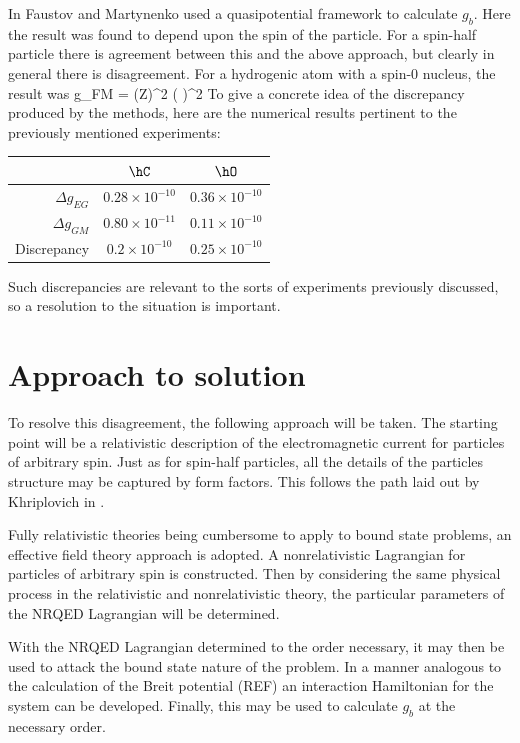 In \cite{doi:10.1139/p02-112} Faustov and Martynenko used a quasipotential framework to calculate $g_b$.  Here the result was found to depend upon the spin of the particle.  For a spin-half particle there is agreement between this and the above approach, but clearly in general there is disagreement.   For a hydrogenic atom with a spin-0 nucleus, the result was
\beq
	\Delta g_{FM} =  (Z\alpha)^2 \left(  \right )^2
\eeq
To give a concrete idea of the discrepancy produced by the methods, here are the numerical results pertinent to the previously mentioned experiments:  
\begin{center}
\begin{tabular}{r c c}
 					&	$\hC$						&	 $\hO$	\\	\hline
 $\Delta g_{EG}$		&	$ 0.28 \times 10^{-10}$ 	&	$ 0.36 \times 10^{-10}$	\\
 $\Delta g_{GM}$		&	$ 0.80 \times 10^{-11}$		&	$ 0.11 \times 10^{-10}$	\\
 Discrepancy			&	$ 0.2 \times 10^{-10}$		&	$ 0.25\times 10^{-10}$	\\
\end{tabular}
\end{center}

Such discrepancies are relevant to the sorts of experiments previously discussed, so a resolution to the situation is important.

\section{Approach to solution}

To resolve this disagreement, the following approach will be taken.  The starting point will be a relativistic description of the electromagnetic current for particles of arbitrary spin.  Just as for spin-half particles, all the details of the particles structure may be captured by form factors.  This follows the path laid out by Khriplovich in \cite{Khriplovich:1997ni,Khriplovich:1998ev,Khriplovich:2000ms}.

Fully relativistic theories being cumbersome to apply to bound state problems, an effective field theory approach is adopted.  A nonrelativistic Lagrangian for particles of arbitrary spin is constructed.  Then by considering the same physical process in the relativistic and nonrelativistic theory, the particular parameters of the NRQED Lagrangian will be determined.

With the NRQED Lagrangian determined to the order necessary, it may then be used to attack the bound state nature of the problem.  In a manner analogous to the calculation of the Breit potential (REF) an interaction Hamiltonian for the system can be developed.  Finally, this may be used to calculate $g_b$ at the necessary order.





